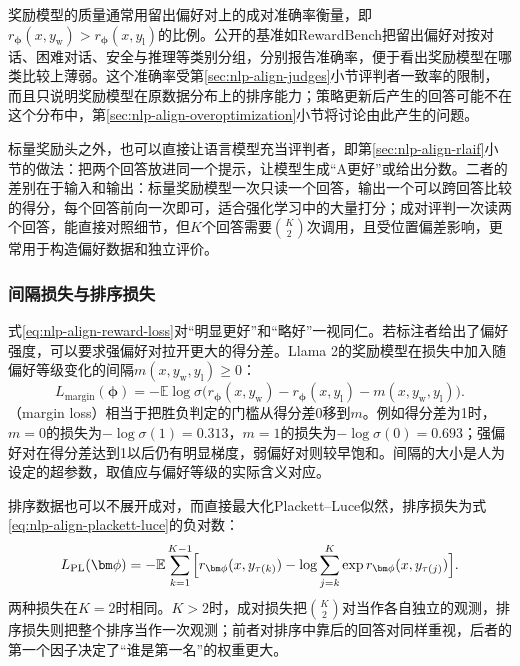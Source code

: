 奖励模型的质量通常用留出偏好对上的成对准确率衡量，即$r_{\bm\phi}(x,y_{\mathrm w})>r_{\bm\phi}(x,y_{\mathrm l})$的比例。公开的基准如RewardBench把留出偏好对按对话、困难对话、安全与推理等类别分组，分别报告准确率，便于看出奖励模型在哪类比较上薄弱。这个准确率受第\ref{sec:nlp-align-judges}小节评判者一致率的限制，而且只说明奖励模型在原数据分布上的排序能力；策略更新后产生的回答可能不在这个分布中，第\ref{sec:nlp-align-overoptimization}小节将讨论由此产生的问题。

标量奖励头之外，也可以直接让语言模型充当评判者，即第\ref{sec:nlp-align-rlaif}小节的做法：把两个回答放进同一个提示，让模型生成“A更好”或给出分数。二者的差别在于输入和输出：标量奖励模型一次只读一个回答，输出一个可以跨回答比较的得分，每个回答前向一次即可，适合强化学习中的大量打分；成对评判一次读两个回答，能直接对照细节，但$K$个回答需要$\binom K2$次调用，且受位置偏差影响，更常用于构造偏好数据和独立评价。

\subsubsection{间隔损失与排序损失}
\label{sec:nlp-align-rm-margin}

式\eqref{eq:nlp-align-reward-loss}对“明显更好”和“略好”一视同仁。若标注者给出了偏好强度，可以要求强偏好对拉开更大的得分差。Llama 2的奖励模型在损失中加入随偏好等级变化的间隔$m(x,y_{\mathrm w},y_{\mathrm l})\ge0$\cite{nlp-align-touvron2023llama2}：
\begin{equation}
\label{eq:nlp-align-margin-loss}
 L_{\mathrm{margin}}(\bm\phi)=-\mathbb E\log\sigma\bigl(r_{\bm\phi}(x,y_{\mathrm w})-r_{\bm\phi}(x,y_{\mathrm l})-m(x,y_{\mathrm w},y_{\mathrm l})\bigr).
\end{equation}
（margin loss）相当于把胜负判定的门槛从得分差0移到$m$。例如得分差为1时，$m=0$的损失为$-\log\sigma(1)=0.313$，$m=1$的损失为$-\log\sigma(0)=0.693$；强偏好对在得分差达到1以后仍有明显梯度，弱偏好对则较早饱和。间隔的大小是人为设定的超参数，取值应与偏好等级的实际含义对应。

排序数据也可以不展开成对，而直接最大化Plackett--Luce似然，排序损失为式\eqref{eq:nlp-align-plackett-luce}的负对数：
\[
 L_{\mathrm{PL}}(\bm\phi)=-\mathbb E\sum_{k=1}^{K-1}\Bigl[r_{\bm\phi}(x,y_{\tau(k)})-\log\sum_{j=k}^{K}\exp r_{\bm\phi}(x,y_{\tau(j)})\Bigr].
\]
两种损失在$K=2$时相同。$K>2$时，成对损失把$\binom K2$对当作各自独立的观测，排序损失则把整个排序当作一次观测；前者对排序中靠后的回答对同样重视，后者的第一个因子决定了“谁是第一名”的权重更大。

